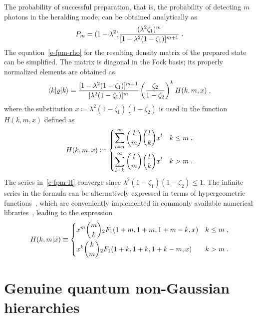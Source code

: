 \documentclass{article}
\begin{document}
The probability of successful preparation, that is, the probability of detecting $m$ photons in the heralding mode, can be obtained analytically as
%
\begin{equation}\label{e-fpm-pro}
  P_{m} = (1 - \lambda^{2}) 
  \frac
    { (\lambda^{2} \zeta_{1})^{m} }
    { [ 1 - \lambda^{2} (1 - \zeta_{1}) ]^{m + 1} } \;\text{.}
\end{equation}
%
The equation~\eqref{e-fpm-rho} for the resulting density matrix of the prepared state can be simplified. The matrix is diagonal in the Fock basis; its properly normalized elements are obtained as
%
\begin{equation}\label{e-fpm-rho-el}
  \braket{ k | \varrho | k } =
  \frac
    { [ 1 - \lambda^{2} (1 - \zeta_{1}) ]^{m + 1} }
    { [ \lambda^{2} (1 - \zeta_{1}) ]^{m} }
  \left( \frac{ \zeta_{2} }{ 1 - \zeta_{2} } \right)^{k}
  H (k, m, x) \;\text{,}
\end{equation}
%
where the substitution ${x \coloneqq \lambda^{2} ( 1 - \zeta_{1} )(1 - \zeta_{2} )}$ is used in the function $H(k, m, x)$ defined as
%
\begin{equation}\label{e-fpm-H}
  H(k, m, x) \coloneq
  \begin{dcases}
    \sum_{l = n}^{\infty}
      \binom{l}{m}
      \binom{l}{k}
      x^{l} 
    & k \leq m \;\text{,} \\
    \sum_{l = k}^{\infty}
      \binom{l}{m}
      \binom{l}{k}
      x^{l}
    & k > m \;\text{.}
  \end{dcases}
\end{equation}
%
The series in~\eqref{e-fpm-H} converge since ${\lambda^{2} ( 1 - \zeta_{1} )(1 - \zeta_{2} ) \leq 1}$. The infinite series in the formula can be alternatively expressed in terms of hypergeometric functions~\cite{bateman1981}, which are conveniently implemented in commonly available numerical libraries~\cite{virtanen2020}, leading to the expression
%
\begin{equation}
  H(k, m \vert x) \equiv
  \begin{dcases}
    x^{m} \binom{m}{k} {}_{2}F_{1} (1 + m, 1 + m, 1 + m - k, x)
    & k \leq m \;\text{,} \\
    x^{k} \binom{k}{m} {}_{2}F_{1} (1 + k, 1 + k, 1 + k - m, x)
    & k > m \;\text{.}
  \end{dcases}
\end{equation}

%
%

\section{Genuine quantum non-Gaussian hierarchies}
\end{document}
